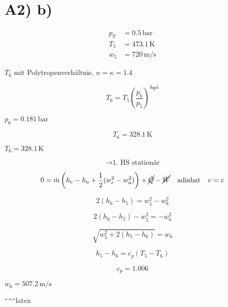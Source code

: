 \section*{A2) b)}

\begin{align*}
p_T &= 0.5 \, \text{bar} \\
T_5 &= 473.1 \, \text{K} \\
w_5 &= 720 \, \text{m/s}
\end{align*}

$T_6$ mit Polytropenverhältnis, $n = \kappa = 1.4$

\[
T_6 = T_5 \left( \frac{p_6}{p_5} \right)^{\frac{n-1}{n}}
\]

$p_6 = 0.181 \, \text{bar}$

\[
T_6 = 328.1 \, \text{K}
\]

\underline{$T_6 = 328.1 \, \text{K}$}

\[
\rightarrow \text{1. HS stationär}
\]

\[
0 = \dot{m} \left( h_e - h_a + \frac{1}{2} (w_e^2 - w_a^2) \right) + \cancel{\dot{Q}} - \cancel{\dot{W}} \quad \text{adiabat} \quad v = c
\]

\[
2(h_6 - h_5) = w_5^2 - w_6^2
\]

\[
2(h_6 - h_5) - w_5^2 = -w_6^2
\]

\[
\sqrt{w_5^2 + 2(h_5 - h_6)} = w_6
\]

\[
h_5 - h_6 = c_p (T_5 - T_6)
\]

\[
c_p = 1.006
\]

\underline{$w_6 = 507.2 \, \text{m/s}$}

``````latex